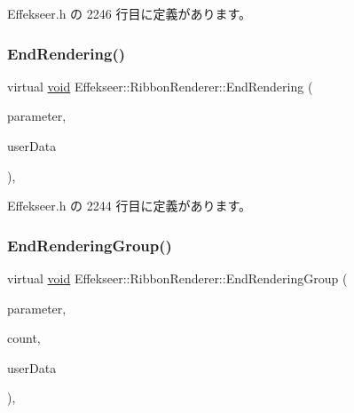  Effekseer.\+h の 2246 行目に定義があります。

\mbox{\label{class_effekseer_1_1_ribbon_renderer_ae8e99c5d635d3128047017c0f3c595bd}} 
\subsubsection{\texorpdfstring{End\+Rendering()}{EndRendering()}}
{\footnotesize\ttfamily virtual \mbox{\hyperlink{namespace_effekseer_ab34c4088e512200cf4c2716f168deb56}{void}} Effekseer\+::\+Ribbon\+Renderer\+::\+End\+Rendering (\begin{DoxyParamCaption}\item[{const \mbox{\hyperlink{struct_effekseer_1_1_ribbon_renderer_1_1_node_parameter}{Node\+Parameter}} \&}]{parameter,  }\item[{\mbox{\hyperlink{namespace_effekseer_ab34c4088e512200cf4c2716f168deb56}{void}} $\ast$}]{user\+Data }\end{DoxyParamCaption})\hspace{0.3cm}{\ttfamily [inline]}, {\ttfamily [virtual]}}



 Effekseer.\+h の 2244 行目に定義があります。

\mbox{\label{class_effekseer_1_1_ribbon_renderer_a9c86184fdf1123a6bdd557540c71ff5e}} 
\subsubsection{\texorpdfstring{End\+Rendering\+Group()}{EndRenderingGroup()}}
{\footnotesize\ttfamily virtual \mbox{\hyperlink{namespace_effekseer_ab34c4088e512200cf4c2716f168deb56}{void}} Effekseer\+::\+Ribbon\+Renderer\+::\+End\+Rendering\+Group (\begin{DoxyParamCaption}\item[{const \mbox{\hyperlink{struct_effekseer_1_1_ribbon_renderer_1_1_node_parameter}{Node\+Parameter}} \&}]{parameter,  }\item[{int32\+\_\+t}]{count,  }\item[{\mbox{\hyperlink{namespace_effekseer_ab34c4088e512200cf4c2716f168deb56}{void}} $\ast$}]{user\+Data }\end{DoxyParamCaption})\hspace{0.3cm}{\ttfamily [inline]}, {\ttfamily [virtual]}}



